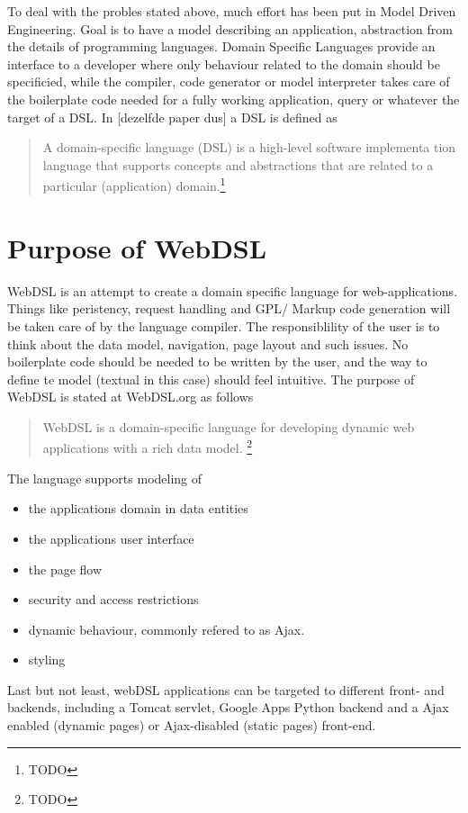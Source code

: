 To deal with the probles stated above, much effort has been put in Model Driven Engineering. Goal is to have a model describing an application, abstraction from the details of programming languages. Domain Specific Languages provide an interface to a developer where only behaviour related to the domain should be specificied, while the compiler, code generator or model interpreter takes care of the boilerplate code needed for a fully working application, query or whatever the target of a DSL. In [dezelfde paper dus] a DSL is defined as
\begin{quote}
A domain-specific language (DSL) is a high-level software implementa
tion language that supports concepts and abstractions that are related
to a particular (application) domain.\footnote{TODO}
\end{quote}
\section[]{Purpose of WebDSL}
WebDSL is an attempt to create a domain specific language for web-applications. Things like peristency, request handling and GPL/ Markup code generation will be taken care of by the language compiler. The responsiblility of the user is to think about the data model, navigation, page layout and such issues. No boilerplate code should be needed to be written by the user, and the way to define te model (textual in this case) should feel intuitive. The purpose of WebDSL is stated at WebDSL.org as follows
\begin{quote}
WebDSL is a domain-specific language for developing dynamic web applications with a rich data model.
\footnote{TODO}
\end{quote}

The language supports modeling of
\begin{itemize}
	\item the applications domain in data entities
	\item the applications user interface
	\item the page flow
	\item security and access restrictions
	\item dynamic behaviour, commonly refered to as Ajax. 
	\item styling
\end{itemize}

Last but not least, webDSL applications can be targeted to different front- and backends, including a Tomcat servlet, Google Apps Python backend and a Ajax enabled (dynamic pages) or Ajax-disabled (static pages) front-end. 

